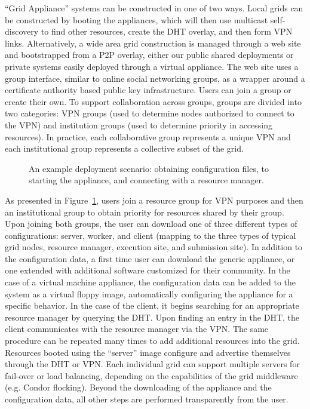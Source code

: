 \documentclass[workingdraft,endnotes]{usetex-v1}
\begin{document}
``Grid Appliance'' systems can be constructed in one of two ways.  Local grids
can be constructed by booting the appliances, which will then use multicast
self-discovery to find other resources, create the DHT overlay, and then form
VPN links.  Alternatively, a wide area grid construction is managed through a
web site and bootstrapped from a P2P overlay, either our public shared
deployments or private systems easily deployed through a virtual appliance.
The web site uses a group interface, similar to online social networking
groups, as a wrapper around a certificate authority based public key
infrastructure.  Users can join a group or create their own.  To support
collaboration across groups, groups are divided into two categories: VPN groups
(used to determine nodes authorized to connect to the VPN) and institution
groups (used to determine priority in accessing resources).  In practice, each
collaborative group represents a unique VPN and each institutional group
represents a collective subset of the grid.  

\begin{figure}[h]
\centering
{}
\caption{An example deployment scenario:  obtaining configuration files, to
starting the appliance, and connecting with a resource manager.}
\label{fig:system}
\end{figure}

As presented in Figure~\ref{fig:system}, users join a resource group for VPN
purposes and then an institutional group to obtain priority for resources
shared by their group.  Upon joining both groups, the user can download one of
three different types of configurations: server, worker, and client (mapping to
the three types of typical grid nodes, resource manager, execution site, and
submission site).  In addition to the configuration data, a first time user can
download the generic appliance, or one extended with additional software
customized for their community.  In the case of a virtual machine appliance,
the configuration data can be added to the system as a virtual floppy image,
automatically configuring the appliance for a specific behavior.  In the case
of the client, it begins searching for an appropriate resource manager by
querying the DHT.  Upon finding an entry in the DHT, the client communicates
with the resource manager via the VPN.  The same procedure can be repeated many
times to add additional resources into the grid.  Resources booted using the
``server'' image configure and advertise themselves through the DHT or VPN.
Each individual grid can support multiple servers for fail-over or load
balancing, depending on the capabilities of the grid middleware (e.g. Condor
flocking).  Beyond the downloading of the appliance and the configuration data,
all other steps are performed transparently from the user.
\end{document}
